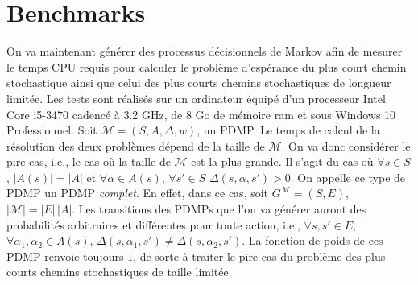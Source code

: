 \documentclass[12pt,a4paper]{report}
\theoremstyle{definition}%
\theoremstyle{remark}
\begin{document}
\section{Benchmarks}\label{benchmarks-section}

On va maintenant générer des processus décisionnels de Markov afin de mesurer
le temps CPU requis pour calculer le problème d'espérance du plus court chemin stochastique ainsi que celui des plus courts chemins stochastiques de longueur limitée. Les tests sont réalisés sur un ordinateur équipé d'un processeur Intel
Core i5-3470 cadencé à 3.2 GHz, de 8 Go de mémoire ram et sous Windows 10 Professionnel. Soit $\mathcal{M} = (S, A, \Delta, w)$, un PDMP.
Le temps de calcul de la résolution des deux problèmes dépend de la taille de
$\mathcal{M}$. On va donc considérer le pire cas, i.e., le cas où la taille de
$\mathcal{M}$ est la plus grande. Il s'agit du cas où $\forall s \in S$,
$|A(s)| = |A|$ et $\forall \alpha \in A(s)$, $\forall s' \in S$ $\Delta(s,
\alpha, s') > 0$. On appelle ce type de PDMP un PDMP \textit{complet}.
En effet, dans ce cas, soit $G^\mathcal{M} = (S, E)$, $|\mathcal{M}| = |E| \,
|A|$. Les transitions des PDMPs que l'on va générer auront des probabilités
arbitraires et différentes pour toute action, i.e., $\forall s, s' \in E$,
$\forall \alpha_1, \alpha_2 \in A(s)$, $\Delta(s, \alpha_1, s') \neq
\Delta(s, \alpha_2, s')$. La fonction de poids de ces PDMP renvoie toujours
$1$, de sorte à traiter le pire cas du problème des plus courts chemins
stochastiques de taille limitée.
\end{document}
